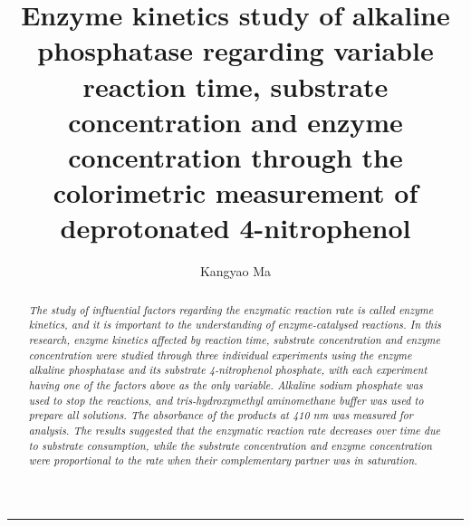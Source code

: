 \documentclass[a4paper,10pt]{article}
\title{Enzyme kinetics study of alkaline phosphatase regarding variable reaction time, substrate concentration and enzyme concentration through the colorimetric measurement of deprotonated 4-nitrophenol}
\author{Kangyao Ma }
\date{}
\begin{document}
\maketitle


\setlength{\absleftindent}{0pt}
\setlength{\absrightindent}{0pt}
\setlength{\abstitleskip}{-1.5em}
\abslabeldelim{:}
\renewcommand{\abstractnamefont}{\itshape\bfseries}
\renewcommand{\absnamepos}{flushleft}


\begin{abstract}
\textit{\small The study of influential factors regarding the enzymatic reaction rate is called enzyme kinetics, and it is important to the understanding of enzyme-catalysed reactions. In this research, enzyme kinetics affected by reaction time, substrate concentration and enzyme concentration were studied through three individual experiments using the enzyme alkaline phosphatase and its substrate 4-nitrophenol phosphate, with each experiment having one of the factors above as the only variable. Alkaline sodium phosphate was used to stop the reactions, and tris-hydroxymethyl aminomethane buffer was used to prepare all solutions. The absorbance of the products at 410 nm was measured for analysis. The results suggested that the enzymatic reaction rate decreases over time due to substrate consumption, while the substrate concentration and enzyme concentration were proportional to the rate when their complementary partner was in saturation. }
\end{abstract}


\hrule
\end{document}
